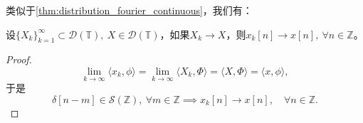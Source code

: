 类似于\cref{thm:distribution_fourier_continuous}，我们有：
\begin{theorem}\label{thm:DTFT_continuous_1}
    设$\{X_k\}_{k=1}^\infty\subset\mathcal{D}(\mathbb{T}),\ X\in\mathcal{D}(\mathbb{T})$，如果$X_k\to X$，则$x_k[n]\to x[n],\ \forall n\in\mathbb{Z}$。
\end{theorem}
\begin{proof}
    \begin{equation}
        \lim_{k\to\infty}\langle x_k,\phi\rangle=\lim_{k\to\infty}\langle X_k,\Phi\rangle=\langle X,\Phi\rangle=\langle x,\phi\rangle,
    \end{equation}
    于是
    \begin{equation}
        \delta[n-m]\in\mathcal{S}(\mathbb{Z}),\ \forall m\in\mathbb{Z}\implies x_k[n]\to x[n],\quad \forall n\in\mathbb{Z}.
    \end{equation}
\end{proof}

